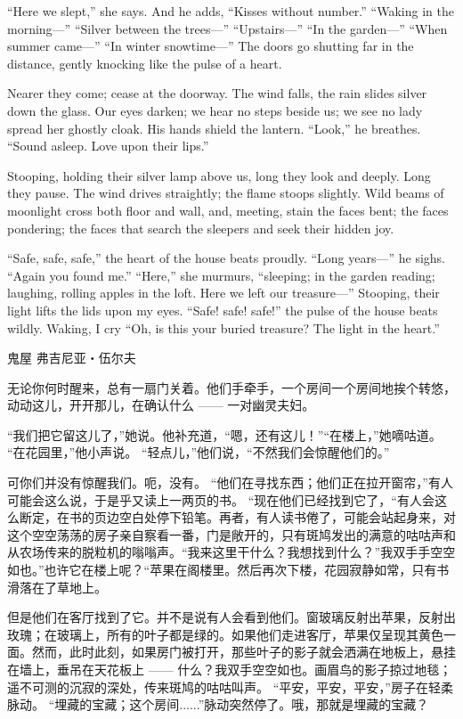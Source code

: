 { 	“Here we slept,” she says. And he adds, “Kisses without number.” “Waking in the morning—” “Silver between the trees—” “Upstairs—” “In the garden—” “When summer came—” “In winter snowtime—” The doors go shutting far in the distance, gently knocking like the pulse of a heart.
 	
 	Nearer they come; cease at the doorway. The wind falls, the rain slides silver down the glass. Our eyes darken; we hear no steps beside us; we see no lady spread her ghostly cloak. His hands shield the lantern. “Look,” he breathes. “Sound asleep. Love upon their lips.”
 	
 	Stooping, holding their silver lamp above us, long they look and deeply. Long they pause. The wind drives straightly; the flame stoops slightly. Wild beams of moonlight cross both floor and wall, and, meeting, stain the faces bent; the faces pondering; the faces that search the sleepers and seek their hidden joy.
 	
 	“Safe, safe, safe,” the heart of the house beats proudly. “Long years—” he sighs. “Again you found me.” “Here,” she murmurs, “sleeping; in the garden reading; laughing, rolling apples in the loft. Here we left our treasure—” Stooping, their light lifts the lids upon my eyes. “Safe! safe! safe!” the pulse of the house beats wildly. Waking, I cry “Oh, is this your buried treasure? The light in the heart.”
 	
 	鬼屋
 	弗吉尼亚・伍尔夫
 	
 	无论你何时醒来，总有一扇门关着。他们手牵手，一个房间一个房间地挨个转悠，动动这儿，开开那儿，在确认什么 —— 一对幽灵夫妇。
 	
 	“我们把它留这儿了，”她说。他补充道，“嗯，还有这儿！”“在楼上，”她嘀咕道。 “在花园里，”他小声说。 “轻点儿，”他们说，“不然我们会惊醒他们的。”
 	
 	可你们并没有惊醒我们。呃，没有。 “他们在寻找东西；他们正在拉开窗帘，”有人可能会这么说，于是乎又读上一两页的书。 “现在他们已经找到它了，“有人会这么断定，在书的页边空白处停下铅笔。再者，有人读书倦了，可能会站起身来，对这个空空荡荡的房子亲自察看一番，门是敞开的，只有斑鸠发出的满意的咕咕声和从农场传来的脱粒机的嗡嗡声。“我来这里干什么？我想找到什么？”我双手手空空如也。”也许它在楼上呢？“苹果在阁楼里。然后再次下楼，花园寂静如常，只有书滑落在了草地上。
 	
 	但是他们在客厅找到了它。并不是说有人会看到他们。窗玻璃反射出苹果，反射出玫瑰；在玻璃上，所有的叶子都是绿的。如果他们走进客厅，苹果仅呈现其黄色一面。然而，此时此刻，如果房门被打开，那些叶子的影子就会洒满在地板上，悬挂在墙上，垂吊在天花板上 —— 什么？我双手空空如也。画眉鸟的影子掠过地毯；遥不可测的沉寂的深处，传来斑鸠的咕咕叫声。 “平安，平安，平安，”房子在轻柔脉动。 “埋藏的宝藏；这个房间......”脉动突然停了。哦，那就是埋藏的宝藏？
 	
}

